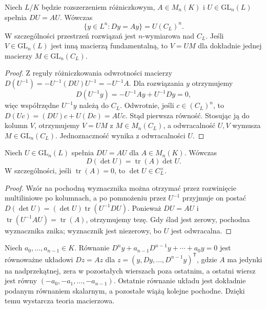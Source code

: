\begin{lemat}
\label{aa:lem:pv-solutions-constants}
Niech $L/K$ będzie rozszerzeniem różniczkowym,
$A\in M_n(K)$ i $U\in\mathrm{GL}_n(L)$
spełnia $DU=AU$. Wówczas
\[
 \{y\in L^n:Dy=Ay\}=U(C_L)^n.
\]
W szczególności przestrzeń rozwiązań
jest $n$-wymiarowa nad $C_L$.
Jeśli $V\in\mathrm{GL}_n(L)$ jest inną
macierzą fundamentalną, to $V=UM$
dla dokładnie jednej macierzy
$M\in\mathrm{GL}_n(C_L)$.
\end{lemat}
\begin{proof}
Z reguły różniczkowania odwrotności macierzy
$D(U^{-1})=-U^{-1}(DU)U^{-1}=-U^{-1}A$.
Dla rozwiązania $y$ otrzymujemy
\[
 D(U^{-1}y)=-U^{-1}Ay+U^{-1}Dy=0,
\]
więc współrzędne $U^{-1}y$ należą do $C_L$.
Odwrotnie, jeśli $c\in(C_L)^n$,
to $D(Uc)=(DU)c+U(Dc)=AUc$.
Stąd pierwsza równość.
Stosując ją do kolumn $V$,
otrzymujemy $V=UM$ z $M\in M_n(C_L)$,
a odwracalność $U,V$ wymusza
$M\in\mathrm{GL}_n(C_L)$. Jednoznaczność
wynika z odwracalności $U$.
\end{proof}

\begin{stwierdzenie}
\label{aa:st:pv-abel-determinant}
Niech $U\in\mathrm{GL}_n(L)$ spełnia
$DU=AU$ dla $A\in M_n(K)$. Wówczas
\[
 D(\det U)=\operatorname{tr}(A)\det U.
\]
W szczególności, jeśli $\operatorname{tr}(A)=0$,
to $\det U\in C_L^\times$.
\end{stwierdzenie}
\begin{proof}
Wzór na pochodną wyznacznika
można otrzymać przez rozwinięcie
multiliniowe po kolumnach,
a po pomnożeniu przez $U^{-1}$
przyjmuje on postać
$D(\det U)=(\det U)\operatorname{tr}(U^{-1}DU)$.
Ponieważ $DU=AU$ i
$\operatorname{tr}(U^{-1}AU)=\operatorname{tr}(A)$,
otrzymujemy tezę. Gdy ślad jest zerowy,
pochodna wyznacznika znika; wyznacznik
jest niezerowy, bo $U$ jest odwracalna.
\end{proof}

\begin{przyklad}
\label{aa:prz:pv-companion}
Niech $a_0,\ldots,a_{n-1}\in K$.
Równanie
$D^ny+a_{n-1}D^{n-1}y+\cdots+a_0y=0$
jest równoważne układowi
$Dz=Az$ dla
$z=(y,Dy,\ldots,D^{n-1}y)^{\mathsf T}$,
gdzie $A$ ma jedynki na nadprzekątnej,
zera w pozostałych wierszach poza ostatnim,
a ostatni wiersz jest równy
$(-a_0,-a_1,\ldots,-a_{n-1})$.
Ostatnie równanie układu jest dokładnie
podanym równaniem skalarnym, a pozostałe
wiążą kolejne pochodne. Dzięki temu
wystarcza teoria macierzowa.
\end{przyklad}

